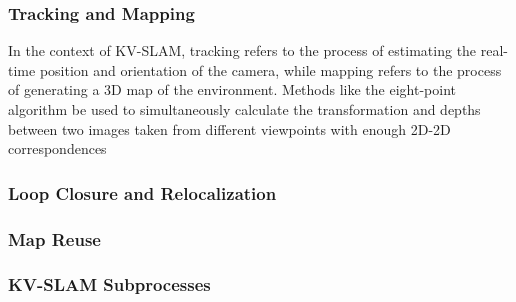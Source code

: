 \subsubsection{Tracking and Mapping}

In the context of KV-SLAM, tracking refers to the process of estimating the real-time position and orientation of the camera, while mapping refers to the process of generating a 3D map of the environment. Methods like the eight-point algorithm be used to simultaneously calculate the transformation and depths between two images taken from different viewpoints with enough 2D-2D correspondences

\subsubsection{Loop Closure and Relocalization}

\subsubsection{Map Reuse}

\subsubsection{KV-SLAM Subprocesses}
